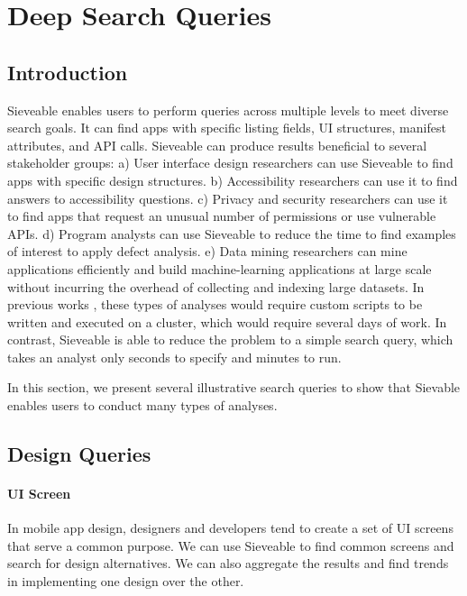 \chapter{Deep Search Queries}
\label{ch:findings_chapter}

\section{Introduction}
Sieveable enables users to perform queries across multiple levels to meet diverse search goals.
It can find apps with specific listing fields, UI structures, manifest attributes, and API calls.
Sieveable can produce results beneficial to several stakeholder groups:
a) User interface design researchers can use Sieveable to find apps with specific design structures.
b) Accessibility researchers can use it to find answers to accessibility questions.
c) Privacy and security researchers can use it to find apps that request an unusual number of permissions or use vulnerable APIs.
d) Program analysts can use Sieveable to reduce the time to find examples of interest to apply defect analysis.
e) Data mining researchers can mine applications efficiently and build machine-learning applications at large scale without incurring the overhead of collecting and indexing large datasets.
In previous works \cite{Alharbi_2015_MobileHCI}, these types of analyses would require custom scripts to be written and executed on a cluster, which would require several days of work.
In contrast, Sieveable is able to reduce the problem to a simple search query, which takes an analyst only seconds to specify and minutes to run.

In this section, we present several illustrative search queries to show that Sievable enables users to conduct many types of analyses.

\section{Design Queries}
\subsubsection{UI Screen}
In mobile app design, designers and developers tend to create a set of UI screens that serve a common purpose. 
We can use Sieveable to find common screens and search for design alternatives.
We can also aggregate the results and find trends in implementing one design over the other.

